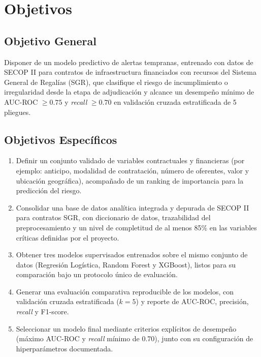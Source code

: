 \section{Objetivos}

\subsection{Objetivo General}
Disponer de un modelo predictivo de alertas tempranas, entrenado con datos de SECOP II para contratos de infraestructura financiados con recursos del Sistema General de Regalías (SGR), que clasifique el riesgo de incumplimiento o irregularidad desde la etapa de adjudicación y alcance un desempeño mínimo de AUC-ROC $\geq 0.75$ y \textit{recall} $\geq 0.70$ en validación cruzada estratificada de 5 pliegues.

\subsection{Objetivos Específicos}
\begin{enumerate}
    \item Definir un conjunto validado de variables contractuales y financieras (por ejemplo: anticipo, modalidad de contratación, número de oferentes, valor y ubicación geográfica), acompañado de un ranking de importancia para la predicción del riesgo.

    \item Consolidar una base de datos analítica integrada y depurada de SECOP II para contratos SGR, con diccionario de datos, trazabilidad del preprocesamiento y un nivel de completitud de al menos 85\% en las variables críticas definidas por el proyecto.

    \item Obtener tres modelos supervisados entrenados sobre el mismo conjunto de datos (Regresión Logística, Random Forest y XGBoost), listos para su comparación bajo un protocolo único de evaluación.

    \item Generar una evaluación comparativa reproducible de los modelos, con validación cruzada estratificada ($k=5$) y reporte de AUC-ROC, precisión, \textit{recall} y F1-score.

    \item Seleccionar un modelo final mediante criterios explícitos de desempeño (máximo AUC-ROC y \textit{recall} mínimo de 0.70), junto con su configuración de hiperparámetros documentada.

\end{enumerate}